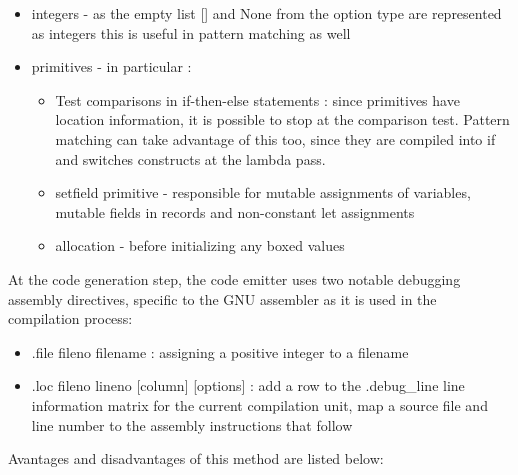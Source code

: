 \begin{itemize}
    \item integers - as the empty list [] and None from the option type are represented as integers
        this is useful in pattern matching as well
    \item primitives - in particular :


        \begin{itemize}
            \item
                Test comparisons in if-then-else statements :
                since primitives have location information, it is possible to
                stop at the comparison test.
                Pattern matching can take advantage of this too, since they are compiled into
                if and switches constructs at the lambda pass.
            \item
                setfield primitive - responsible for mutable assignments of variables, mutable
                fields in records and non-constant let assignments
            \item
                allocation - before initializing any boxed values
        \end{itemize}
\end{itemize}

At the code generation step, the code emitter uses two notable debugging
assembly directives, specific to the GNU assembler as it is used in the
compilation process:


\begin{itemize}
    \item .file fileno filename : assigning a positive integer to a filename
    \item .loc fileno lineno [column] [options] : add a row to the .debug\_line
        line information matrix for the current compilation unit, map a source
        file and line number to the assembly instructions that follow
\end{itemize}

Avantages and disadvantages of this method are listed below:

